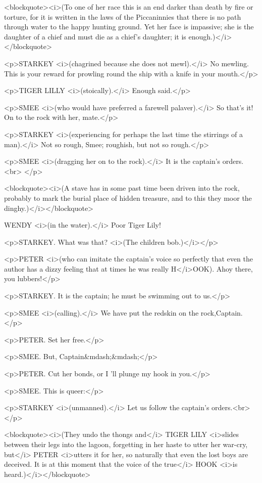 <blockquote><i>(To one of her race this is an end darker than death
by fire or torture, for it is written in the laws of the Piccaninnies
that there is no path through water to the happy hunting ground. Yet
her face is impassive; she is the daughter of a chief and must die as
a chief's daughter; it is enough.)</i></blockquote>

<p>STARKEY <i>(chagrined because she does not mewl).</i> No mewling.
This is your reward for prowling round the ship with a knife in your
mouth.</p>

<p>TIGER LILLY <i>(stoically).</i> Enough said.</p>

<p>SMEE <i>(who would have preferred a farewell palaver).</i> So
that's it! On to the rock with her, mate.</p>

<p>STARKEY <i>(experiencing for perhaps the last time the stirrings
of a man).</i> Not so rough, Smee; roughish, but not so rough.</p>

<p>SMEE <i>(dragging her on to the rock).</i> It is the captain's
orders.<br>
</p>

<blockquote><i>(A stave has in some past time been driven into the
rock, probably to mark the burial place of hidden treasure, and to
this they moor the dinghy.)</i></blockquote>

WENDY <i>(in the water).</i> Poor Tiger Lily! 

<p>STARKEY. What was that? <i>(The children bob.)</i></p>

<p>PETER <i>(who can imitate the captain's voice so perfectly that
even the author has a dizzy feeling that at times he was really
H</i>OOK). Ahoy there, you lubbers!</p>

<p>STARKEY. It is the captain; he must be swimming out to us.</p>

<p>SMEE <i>(calling).</i> We have put the redskin on the
rock,Captain.</p>

<p>PETER. Set her free.</p>

<p>SMEE. But, Captain&mdash;&mdash;</p>

<p>PETER. Cut her bonds, or I 'll plunge my hook in you.</p>

<p>SMEE. This is queer:</p>

<p>STARKEY <i>(unmanned).</i> Let us follow the captain's orders.<br>
</p>

<blockquote><i>(They undo the thongs and</i> TIGER LILY <i>slides
between their legs into the lagoon, forgetting in her haste to utter
her war-cry, but</i> PETER <i>utters it for her, so naturally that
even the lost boys are deceived. It is at this moment that the voice
of the true</i> HOOK <i>is heard.)</i></blockquote>

